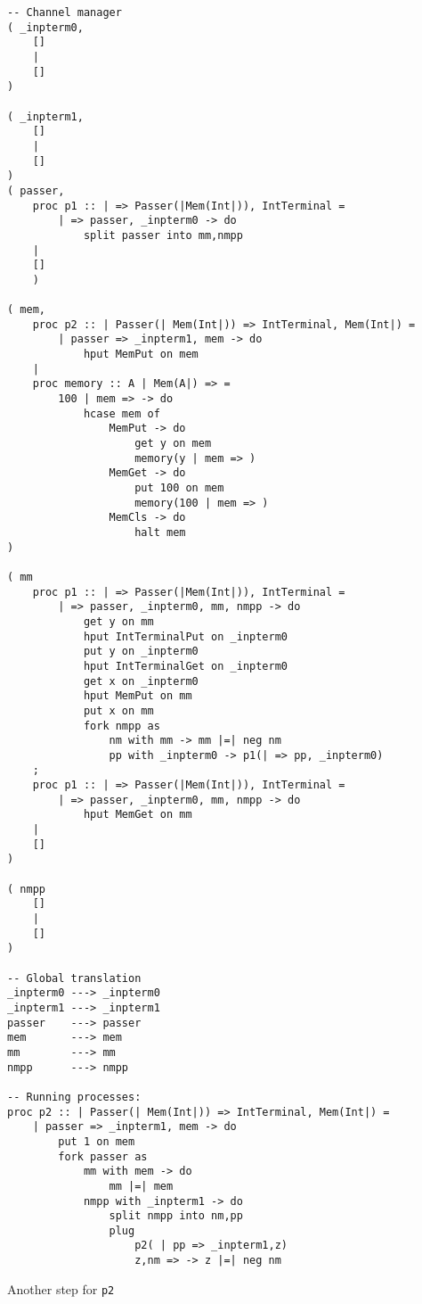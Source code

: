 \documentclass{article}
\theoremstyle{plain}%
\theoremstyle{definition}
\theoremstyle{remark}
\begin{document}
\begin{verbatim}
-- Channel manager
( _inpterm0,  
    []
    |
    []
)

( _inpterm1,  
    []
    |
    []
)
( passer,
    proc p1 :: | => Passer(|Mem(Int|)), IntTerminal = 
        | => passer, _inpterm0 -> do
            split passer into mm,nmpp 
    |
    []
    )

( mem,
    proc p2 :: | Passer(| Mem(Int|)) => IntTerminal, Mem(Int|) =
        | passer => _inpterm1, mem -> do
            hput MemPut on mem
    |
    proc memory :: A | Mem(A|) => =
        100 | mem => -> do
            hcase mem of
                MemPut -> do
                    get y on mem
                    memory(y | mem => )
                MemGet -> do
                    put 100 on mem
                    memory(100 | mem => )
                MemCls -> do
                    halt mem
)

( mm
    proc p1 :: | => Passer(|Mem(Int|)), IntTerminal = 
        | => passer, _inpterm0, mm, nmpp -> do
            get y on mm
            hput IntTerminalPut on _inpterm0
            put y on _inpterm0
            hput IntTerminalGet on _inpterm0
            get x on _inpterm0
            hput MemPut on mm
            put x on mm
            fork nmpp as
                nm with mm -> mm |=| neg nm 
                pp with _inpterm0 -> p1(| => pp, _inpterm0)
    ;
    proc p1 :: | => Passer(|Mem(Int|)), IntTerminal = 
        | => passer, _inpterm0, mm, nmpp -> do
            hput MemGet on mm 
    |
    []
)

( nmpp
    []
    |
    []
)

-- Global translation
_inpterm0 ---> _inpterm0 
_inpterm1 ---> _inpterm1 
passer    ---> passer 
mem       ---> mem
mm        ---> mm
nmpp      ---> nmpp

-- Running processes:
proc p2 :: | Passer(| Mem(Int|)) => IntTerminal, Mem(Int|) =
    | passer => _inpterm1, mem -> do
        put 1 on mem
        fork passer as
            mm with mem -> do
                mm |=| mem
            nmpp with _inpterm1 -> do
                split nmpp into nm,pp
                plug
                    p2( | pp => _inpterm1,z)
                    z,nm => -> z |=| neg nm
\end{verbatim}
Another step for \verb|p2|
\end{document}
